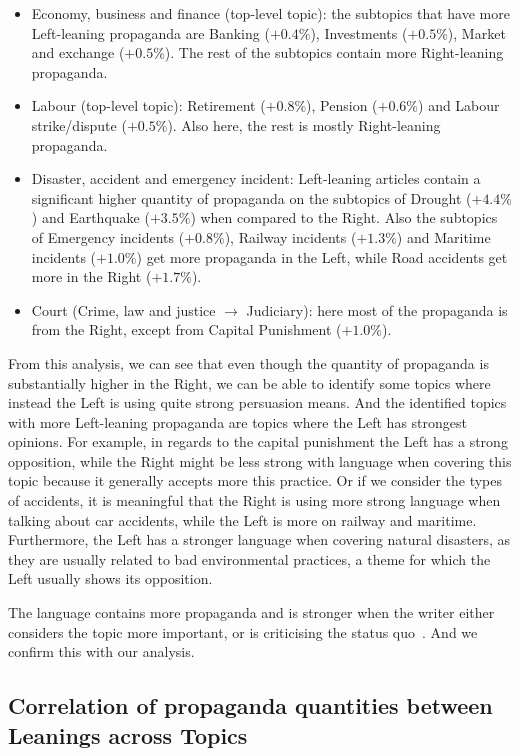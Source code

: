\begin{itemize}
    \item Economy, business and finance (top-level topic): the subtopics that have more Left-leaning propaganda  are Banking ($+0.4\%$), Investments ($+0.5\%$), Market and exchange ($+0.5\%$). The rest of the subtopics contain more Right-leaning propaganda.
    \item Labour (top-level topic): Retirement ($+0.8\%$), Pension ($+0.6\%$) and Labour strike/dispute ($+0.5\%$). Also here, the rest is mostly Right-leaning propaganda.
    \item Disaster, accident and emergency incident: Left-leaning articles contain a significant higher quantity of propaganda on the subtopics of Drought ($+4.4\%$) and Earthquake ($+3.5\%$) when compared to the Right. Also the subtopics of Emergency incidents ($+0.8\%$), Railway incidents ($+1.3\%$) and Maritime incidents ($+1.0\%$) get more propaganda in the Left, while Road accidents get more in the Right ($+1.7\%$).
    \item Court (Crime, law and justice $\rightarrow$ Judiciary): here most of the propaganda is from the Right, except from Capital Punishment ($+1.0\%$).
\end{itemize}

From this analysis, we can see that even though the quantity of propaganda is substantially higher in the Right, we can be able to identify some topics where instead the Left is using quite strong persuasion means.
And the identified topics with more Left-leaning propaganda are topics where the Left has strongest opinions. For example, in regards to the capital punishment the Left has a strong opposition, while the Right might be less strong with language when covering this topic because it generally accepts more this practice.
Or if we consider the types of accidents, it is meaningful that the Right is using more strong language when talking about car accidents, while the Left is more on railway and maritime. Furthermore, the Left has a stronger language when covering natural disasters, as they are usually related to bad environmental practices, a theme for which the Left usually shows its opposition.

The language contains more propaganda and is stronger when the writer either considers the topic more important, or is criticising the status quo~\citep{rose1992political}. And we confirm this with our analysis.  


\subsection{\statusgreen Correlation of propaganda quantities between Leanings across Topics}
\label{ssec:topic_propaganda_leaning_tech_quantities}

